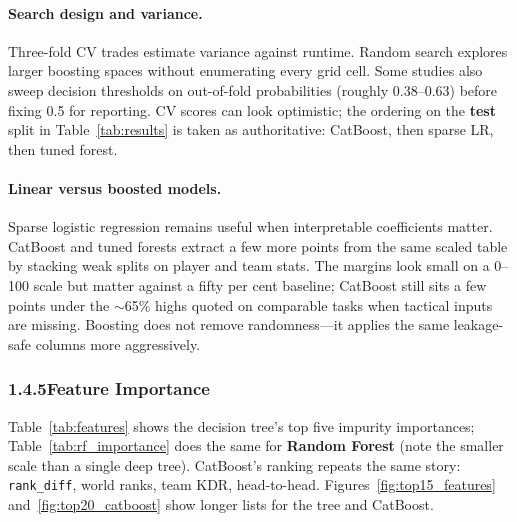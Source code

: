 \documentclass[12pt,a4paper]{article}
\begin{document}
\paragraph{Search design and variance.}
Three-fold CV trades estimate variance against runtime. Random search explores larger boosting spaces without enumerating every grid cell. Some studies also sweep decision thresholds on out-of-fold probabilities (roughly 0.38--0.63) before fixing 0.5 for reporting. CV scores can look optimistic; the ordering on the \textbf{test} split in Table~\ref{tab:results} is taken as authoritative: CatBoost, then sparse LR, then tuned forest.

\paragraph{Linear versus boosted models.}
Sparse logistic regression remains useful when interpretable coefficients matter. CatBoost and tuned forests extract a few more points from the same scaled table by stacking weak splits on player and team stats. The margins look small on a 0--100 scale but matter against a fifty per cent baseline; CatBoost still sits a few points under the $\sim$65\% highs quoted on comparable tasks when tactical inputs are missing. Boosting does not remove randomness---it applies the same leakage-safe columns more aggressively.

\subsubsection{1.4.5\quad Feature Importance}

Table~\ref{tab:features} shows the decision tree's top five impurity importances; Table~\ref{tab:rf_importance} does the same for \textbf{Random Forest} (note the smaller scale than a single deep tree). CatBoost's ranking repeats the same story: \texttt{rank\_diff}, world ranks, team KDR, head-to-head. Figures~\ref{fig:top15_features} and~\ref{fig:top20_catboost} show longer lists for the tree and CatBoost.
\end{document}
